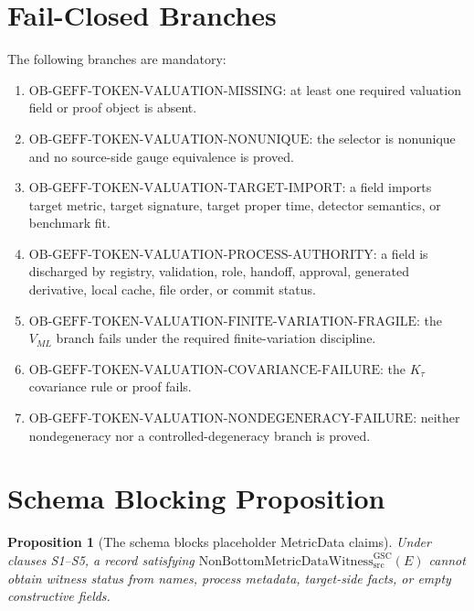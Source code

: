 \documentclass[11pt]{article}
\newtheorem{proposition}{Proposition}
\newcommand{\Witness}{\mathrm{NonBottomMetricDataWitness}_{\mathrm{src}}^{\mathrm{GSC}}}
\begin{document}
\section{Fail-Closed Branches}

The following branches are mandatory:
\begin{enumerate}[label=\textbf{OB\arabic*.}]
  \item \(\mathrm{OB\mbox{-}GEFF\mbox{-}TOKEN\mbox{-}VALUATION\mbox{-}MISSING}\):
  at least one required valuation field or proof object is absent.
  \item \(\mathrm{OB\mbox{-}GEFF\mbox{-}TOKEN\mbox{-}VALUATION\mbox{-}NONUNIQUE}\):
  the selector is nonunique and no source-side gauge equivalence is proved.
  \item \(\mathrm{OB\mbox{-}GEFF\mbox{-}TOKEN\mbox{-}VALUATION\mbox{-}TARGET\mbox{-}IMPORT}\):
  a field imports target metric, target signature, target proper time,
  detector semantics, or benchmark fit.
  \item \(\mathrm{OB\mbox{-}GEFF\mbox{-}TOKEN\mbox{-}VALUATION\mbox{-}PROCESS\mbox{-}AUTHORITY}\):
  a field is discharged by registry, validation, role, handoff, approval,
  generated derivative, local cache, file order, or commit status.
  \item \(\mathrm{OB\mbox{-}GEFF\mbox{-}TOKEN\mbox{-}VALUATION\mbox{-}FINITE\mbox{-}VARIATION\mbox{-}FRAGILE}\):
  the \(V_{ML}\) branch fails under the required finite-variation discipline.
  \item \(\mathrm{OB\mbox{-}GEFF\mbox{-}TOKEN\mbox{-}VALUATION\mbox{-}COVARIANCE\mbox{-}FAILURE}\):
  the \(K_{\tau}\) covariance rule or proof fails.
  \item \(\mathrm{OB\mbox{-}GEFF\mbox{-}TOKEN\mbox{-}VALUATION\mbox{-}NONDEGENERACY\mbox{-}FAILURE}\):
  neither nondegeneracy nor a controlled-degeneracy branch is proved.
\end{enumerate}

\section{Schema Blocking Proposition}

\begin{proposition}[The schema blocks placeholder MetricData claims]
Under clauses S1--S5, a record satisfying \(\Witness(E)\) cannot obtain
witness status from names, process metadata, target-side facts, or empty
constructive fields.
\end{proposition}
\end{document}

